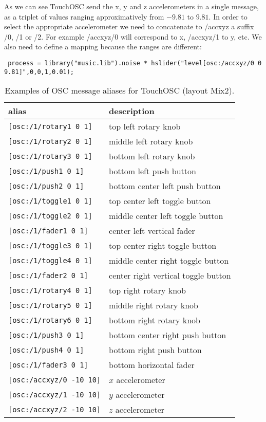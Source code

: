 As we can see TouchOSC send the x, y and z accelerometers in a single message, as a triplet of values ranging approximatively from $-9.81$ to $9.81$. In order to select the appropriate accelerometer we need to concatenate to /accxyz a suffix /0, /1 or /2. For example /accxyz/0 will correspond to x, /accxyz/1 to y, etc. We also need to define a mapping because the ranges are different:

\begin{lstlisting}
 process = library("music.lib").noise * hslider("level[osc:/accxyz/0 0 9.81]",0,0,1,0.01);
\end{lstlisting}



\begin{table}[htdp]
\begin{center}
\begin{tabular}{|l|l|}
\hline
\bf{alias} 	& \bf{description}	\\
\hline
\lstinline'[osc:/1/rotary1 0 1]' & top left rotary knob\\
\lstinline'[osc:/1/rotary2 0 1]' & middle left rotary knob\\
\lstinline'[osc:/1/rotary3 0 1]' & bottom left rotary knob\\
\lstinline'[osc:/1/push1 0 1]' & bottom left push button\\
\lstinline'[osc:/1/push2 0 1]' & bottom center left push button\\
\hline
\lstinline'[osc:/1/toggle1 0 1]' & top center left toggle button\\
\lstinline'[osc:/1/toggle2 0 1]' & middle center left toggle button\\
\lstinline'[osc:/1/fader1 0 1]' & center left vertical fader\\
\hline
\lstinline'[osc:/1/toggle3 0 1]' & top center right toggle button\\
\lstinline'[osc:/1/toggle4 0 1]' & middle center right toggle button\\
\lstinline'[osc:/1/fader2 0 1]' & center right vertical toggle button\\
\hline
\lstinline'[osc:/1/rotary4 0 1]' & top right rotary knob\\
\lstinline'[osc:/1/rotary5 0 1]' & middle right rotary knob\\
\lstinline'[osc:/1/rotary6 0 1]' & bottom right rotary knob\\
\lstinline'[osc:/1/push3 0 1]' & bottom center right push button\\
\lstinline'[osc:/1/push4 0 1]' & bottom right push button\\
\hline
\lstinline'[osc:/1/fader3 0 1]' & bottom horizontal fader\\
\hline
\lstinline'[osc:/accxyz/0 -10 10]' &  $x$ accelerometer\\
\lstinline'[osc:/accxyz/1 -10 10]' &  $y$ accelerometer\\
\lstinline'[osc:/accxyz/2 -10 10]' &  $z$ accelerometer\\
\hline
\end{tabular}
\end{center}
\caption{Examples of OSC message aliases for TouchOSC (layout Mix2).}
\label{tab:oscalias}
\end{table}

